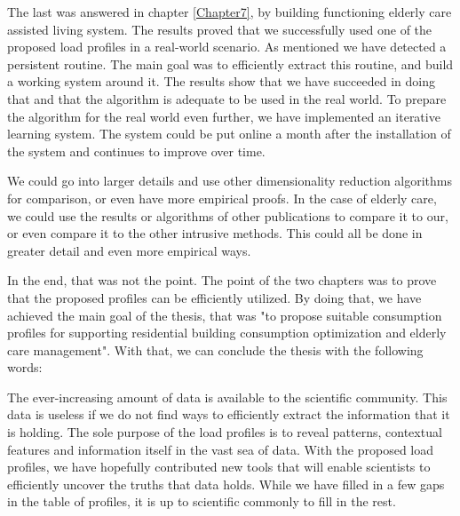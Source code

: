 The last was answered in chapter \ref{Chapter7}, by building functioning elderly care assisted living system. 
The results proved that we successfully used one of the proposed load profiles in a real-world scenario. 
As mentioned we have detected a persistent routine. The main goal was to efficiently extract this routine, and build a working system around it.
The results show that we have succeeded in doing that and that the algorithm is adequate to be used in the real world.
To prepare the algorithm for the real world even further, we have implemented an iterative learning system.
The system could be put online a month after the installation of the system and continues to improve over time.

We could go into larger details and use other dimensionality reduction algorithms for comparison, or even have more empirical proofs. 
In the case of elderly care, we could use the results or algorithms of other publications to compare it to our, or even compare it to the other intrusive methods. 
This could all be done in greater detail and even more empirical ways.

In the end, that was not the point.
The point of the two chapters was to prove that the proposed profiles can be efficiently utilized. 
By doing that, we have achieved the main goal of the thesis,
that was "to propose suitable consumption profiles for supporting residential building consumption optimization and elderly care management".
With that, we can conclude the thesis with the following words:

The ever-increasing amount of data is available to the scientific community.
This data is useless if we do not find ways to efficiently extract the information that it is holding.
The sole purpose of the load profiles is to reveal patterns, contextual features and information itself in the vast sea of data.
With the proposed load profiles, we have hopefully contributed new tools that will enable scientists to efficiently uncover the truths that data holds. 
While we have filled in a few gaps in the table of profiles, it is up to scientific commonly to fill in the rest.